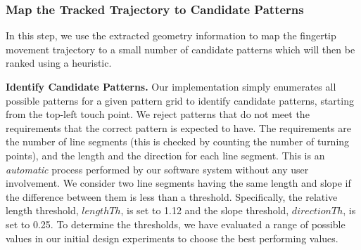 
    \subsubsection{Map the Tracked Trajectory to Candidate Patterns\label{section:identity}}
       In this step, we use the extracted geometry information to map the fingertip movement trajectory to a small number of candidate patterns which will then be ranked using a heuristic. %

       \noindent \textbf{Identify Candidate Patterns.} Our implementation simply enumerates all possible
        patterns for a given pattern grid to identify candidate patterns, starting from the top-left touch point.
        We reject patterns that do not meet the requirements that the correct pattern is expected to have. The requirements are the number of line segments (this is checked by counting the number of turning points), and the length and the direction for each
        line segment.
        This is an \emph{automatic} process performed by our software system without any user involvement.
       We consider two line segments having the same length and slope if the difference between them is less
       than a threshold. Specifically, the relative length threshold, $lengthTh$, is set to 1.12 and the slope threshold, $directionTh$, is set to 0.25.
       To determine the thresholds, we have evaluated a range of possible values in our initial design experiments to choose the best performing values.

